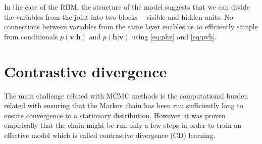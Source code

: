 In the case of the RBM, the structure of the model suggests that we can divide the variables from the joint into two blocks -- visible and hidden units. No connections between variables from the same layer enables us to efficiently sample from conditionals $p(\mathbf{v}| \mathbf{h})$ and $p(\mathbf{h} | \mathbf{v})$ using \ref{eq:phv} and \ref{eq:pvh}.
    
\section{Contrastive divergence}
The main challenge related with MCMC methods is the computational burden related with ensuring that the Markov chain has been run sufficiently long to ensure convergence to a stationary distribution. However, it was proven empirically that the chain might be run only a few steps in order to train an effective model \cite{hinton2002training} which is called contrastive divergence (CD) learning. 
 
